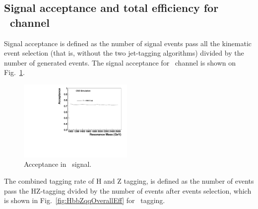 \clearpage

\subsection{Signal acceptance and total efficiency for \HbbZqq\ channel}

Signal acceptance is defined as the number of signal events pass all
the kinematic event selection (that is, without the two jet-tagging
algorithms) divided by the number of generated events.  The signal
acceptance for \HbbZqq\ channel is shown on Fig.~\ref{fig:Acc}.

\begin{figure}[htb]
\begin{center}
\includegraphics[width=0.49\textwidth]{EXO-14-009/HbbZqqfigs/Signal/HbbZqq-signal-acc-8TeV.pdf}
\end{center}
\caption{
Acceptance in \HbbZqq\ signal.
}
\label{fig:Acc}
\end{figure}

The combined tagging rate of H and Z tagging, is defined as the number of 
events pass the HZ-tagging dvided by the number of events after events
selection, which is shown in Fig.~\ref{fig:HbbZqqOverallEff} for \HbbZqq\ 
tagging. 

